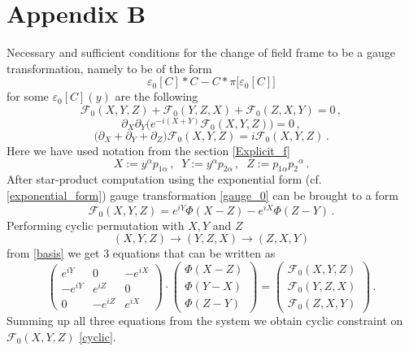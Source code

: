 \documentclass[12pt]{article}
\renewcommand{\theequation}{\thesection.\arabic{equation}}
\begin{document}
\renewcommand{\theequation}{\Alph{appendix}.\arabic{equation}}
\addtocounter{appendix}{1} \setcounter{equation}{0}
\addtocounter{section}{1}

\section*{Appendix B}\label{AppB}


Necessary and sufficient conditions for the change of field frame to be a gauge transformation, namely to be of the form
\begin{equation}\label{gauge_0}
\varepsilon_0[C] \ast C-C\ast \pi\big[\varepsilon_0[C]\big]
\end{equation} 
for some $\varepsilon_0[C](y)$ are the following
\begin{equation}\label{cyclic}
\mathscr{F}_0(X,Y,Z)+\mathscr{F}_0(Y,Z,X)+\mathscr{F}_0(Z,X,Y)=0\,,
\end{equation}
\begin{equation}\label{factor}
\partial_X \partial_Y\Big(e^{-i(X+Y)}\mathscr{F}_0(X,Y,Z)\Big)=0\,,
\end{equation}
\begin{equation}\label{strange}
\big(\partial_X+\partial_Y+\partial_Z\big)\mathscr{F}_0(X,Y,Z)=i\mathscr{F}_0(X,Y,Z)\,.
\end{equation}
Here we have used notation from the section \ref{Explicit_f}
\begin{equation}
X:=y^\alpha p_{1\alpha}\,,\;\; Y:=y^\alpha p_{2\alpha}\,,\;\; Z:=p_{1\alpha} p_2 {}^\alpha\,.
\end{equation}
After star-product computation using the exponential form (cf. \eqref{exponential_form})  gauge transformation \eqref{gauge_0} can be brought to a form
\begin{equation}\label{basis}
\mathscr{F}_0(X,Y,Z)=e^{iY}\Phi(X-Z)-e^{iX}\Phi(Z-Y)\,.
\end{equation}
Performing cyclic permutation with $X,Y$ and $Z$ 
\begin{equation}
(X,Y,Z)\rightarrow (Y,Z,X)\rightarrow (Z,X,Y)
\end{equation}
from \eqref{basis} we get 3 equations that can be written as
\begin{equation}\label{system}
\left(\begin{matrix}
e^{iY} & 0 & -e^{iX} \\
-e^{iY} & e^{iZ} & 0\\
0 & -e^{iZ} & e^{iX}
\end{matrix}\right)\cdot \left(\begin{matrix}
\Phi(X-Z)\\
\Phi(Y-X)\\
\Phi(Z-Y)
\end{matrix}\right)=\left(\begin{matrix}
\mathscr{F}_0(X,Y,Z)\\
\mathscr{F}_0 (Y,Z,X)\\
\mathscr{F}_0 (Z,X,Y)
\end{matrix}\right)\,.
\end{equation}
Summing up all three equations from the system we obtain cyclic constraint on $\mathscr{F}_0(X,Y,Z)$ \eqref{cyclic}.
\end{document}
